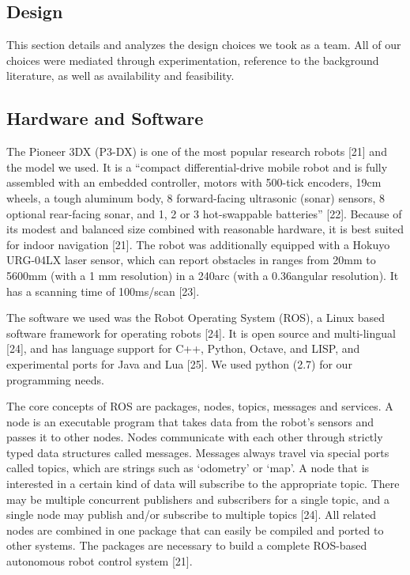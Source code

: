 \documentclass{article}
\begin{document}
	\begin{multicols}{2}
    \section{Design}
This section details and analyzes the design choices we took as a team. All of our choices were mediated through experimentation, reference to the background literature, as well as availability and feasibility.

	\subsection{Hardware and Software}    
    The Pioneer 3DX (P3-DX) is one of the most popular research robots [21] and the model we used.  It is a “compact differential-drive mobile robot and is fully assembled with an embedded controller, motors with 500-tick encoders, 19cm wheels, a tough aluminum body, 8 forward-facing ultrasonic (sonar) sensors, 8 optional rear-facing sonar, and 1, 2 or 3 hot-swappable batteries” [22].  Because of its modest and balanced size combined with reasonable hardware, it is best suited for indoor navigation [21]. The robot was additionally equipped with a Hokuyo URG-04LX laser sensor, which can report obstacles in ranges from 20mm to 5600mm (with a 1 mm resolution) in a 240\degree arc (with a 0.36\degree angular resolution). It has a scanning time of 100ms/scan [23]. 

The software we used was the Robot Operating System (ROS),  a Linux based software framework for operating robots [24]. It is open source and multi-lingual [24], and has language support for  C++, Python, Octave, and LISP, and experimental ports for Java and Lua [25]. We used python (2.7) for our programming needs.

The core concepts of ROS are packages, nodes, topics, messages and services. A node is an executable program that takes data from the robot's sensors and passes it to other nodes. Nodes communicate with each other through strictly typed data structures called messages. Messages always travel via special ports called topics, which are strings such as ‘odometry’ or ‘map’. A node that is interested in a certain kind of data will subscribe to the appropriate topic. There may be multiple concurrent publishers and subscribers for a single topic, and a single node may publish and/or subscribe to multiple topics [24]. All related nodes are combined in one package that can easily be compiled and ported to other systems. The packages are necessary to build a complete ROS-based autonomous robot control system [21].


\end{multicols}
\end{document}
